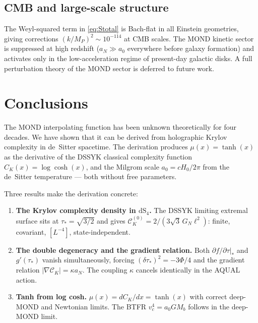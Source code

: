 \documentclass[a4paper,11pt]{article}
\newcommand{\CK}{\mathcal{C}_K}                     %
\newcommand{\CKz}{\mathcal{C}_K^{(0)}}              %
\newcommand{\tausk}{\tau_*}                          %
\newcommand{\kap}{\kappa}                            %
\newcommand{\az}{a_0}                                %
\newcommand{\aN}{a_N}                                %
\newcommand{\Mpl}{M_P}                               %
\newcommand{\GN}{G_N}                                %
\newcommand{\dS}[1]{\mathrm{dS}_{#1}}               %
\begin{document}
\subsection{CMB and large-scale structure}

The Weyl-squared term in \eqref{eq:Stotal} is Bach-flat in all Einstein
geometries, giving corrections $(k/\Mpl)^2\sim10^{-114}$ at CMB scales.
The MOND kinetic sector is suppressed at high redshift ($\aN\gg\az$
everywhere before galaxy formation) and activates only in the
low-acceleration regime of present-day galactic disks.  A full
perturbation theory of the MOND sector is deferred to future work.

\section{Conclusions}
\label{sec:conclusions}

The MOND interpolating function has been unknown theoretically for four
decades.  We have shown that it can be derived from holographic Krylov
complexity in de~Sitter spacetime.  The derivation produces
$\mu(x)=\tanh(x)$ as the derivative of the DSSYK classical complexity
function $C_K(x)=\log\cosh(x)$, and the Milgrom scale
$\az=cH_0/2\pi$ from the de~Sitter temperature --- both without free
parameters.

Three results make the derivation concrete:

\begin{enumerate}
  \item \textbf{The Krylov complexity density in $\dS{4}$.}
    The DSSYK limiting extremal surface sits at
    $\tausk=\sqrt{3/2}$ and gives
    $\CKz=2/(3\sqrt{3}\,\GN\ell^2)$: finite, covariant, $[L^{-4}]$,
    state-independent.

  \item \textbf{The double degeneracy and the gradient relation.}
    Both $\partial f/\partial\tau|_*$ and $g'(\tausk)$ vanish
    simultaneously, forcing $(\delta\tausk)^2=-3\Phi/4$ and the gradient
    relation $|\nabla\CK|=\kap\aN$.  The coupling $\kap$ cancels
    identically in the AQUAL action.

  \item \textbf{Tanh from log cosh.}
    $\mu(x)=dC_K/dx=\tanh(x)$ with correct deep-MOND and Newtonian
    limits.  The BTFR $v_c^4=\az GM_b$ follows in the deep-MOND limit.
\end{enumerate}
\end{document}
